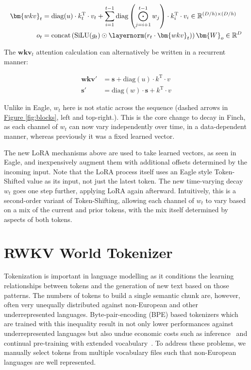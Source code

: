 \begin{align}
\bm{wkv}_{t} &=  \mathrm{diag}(u)\cdot k_{t}^\mathrm{T} \cdot v_{t} + \sum_{i=1}^{t-1}  \mathrm{diag}\left(\bigodot_{j=i+1}^{t-1}w_{j}\right) \cdot  k_{i}^\mathrm{T} \cdot v_{i}  \in \mathbb{R}^{(D/h) \times (D/h)} \\
o_t &= \mathrm{concat}\left(\mathrm{SiLU}(g_t) \odot \layernorm(r_{t} \cdot \bm{wkv}_{t})\right)\bm{W}_o \in \mathbb{R}^{D} 
\end{align}

The $\bm{wkv}_{t}$ attention calculation can alternatively be written in a recurrent manner:

\begin{align}
\label{eq:time-mixer6}
\bm{wkv}' &= \bm{s} + \mathrm{diag}(u) \cdot k^\mathrm{T} \cdot v \\
\bm{s}' &= \mathrm{diag}(w) \cdot \bm{s} + k^\mathrm{T} \cdot v
\end{align}

Unlike in Eagle, $w_t$ here is not static across the sequence (dashed arrows in \hyperref[fig:blocks]{Figure \ref*{fig:blocks}}, left and top-right.). This is the core change to decay in Finch, as each channel of $w_t$ can now vary independently over time, in a data-dependent manner, whereas previously it was a fixed learned vector.

The new LoRA mechanisms above are used to take learned vectors, as seen in Eagle, and inexpensively augment them with additional offsets determined by the incoming input. Note that the LoRA process itself uses an Eagle style Token-Shifted value as its input, not just the latest token. The new time-varying decay $w_t$ goes one step further, applying LoRA again afterward. Intuitively, this is a second-order variant of Token-Shifting, allowing each channel of $w_t$ to vary based on a mix of the current and prior tokens, with the mix itself determined by aspects of both tokens.

\section{RWKV World Tokenizer}\label{sec:tokenizer}
Tokenization is important in language modelling as it conditions the learning relationships between tokens and the generation of new text based on those patterns. The numbers of tokens to build a single semantic chunk are, however, often very unequally distributed against non-European and other underrepresented languages. Byte-pair-encoding (BPE) based tokenizers which are trained with this inequality result in not only lower performances against underrepresented languages but also undue economic costs such as inference~\cite{ahia2023languageCost} and continual pre-training  with extended vocabulary~\cite{mala500lin2024, elyzallama2023}. To address these problems, we manually select tokens from multiple vocabulary files such that non-European languages are well represented.

